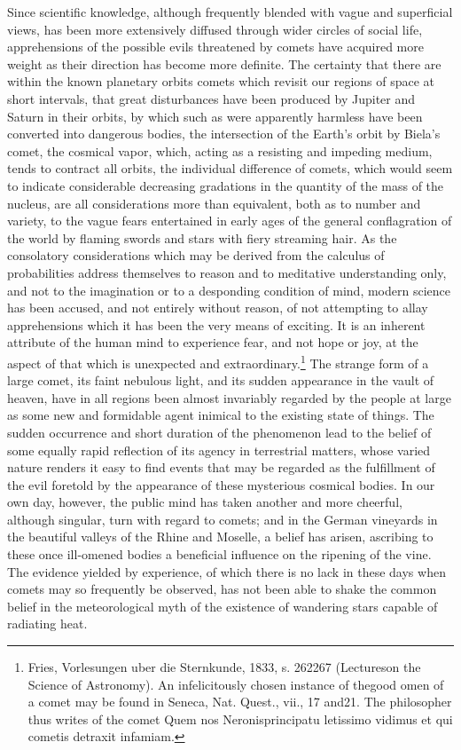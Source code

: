 Since scientific knowledge, although frequently blended with vague and superficial views, has been more extensively diffused through wider circles of social life, apprehensions of the possible evils threatened by comets have acquired more weight as their direction has become more definite. The certainty that there are within the known planetary orbits comets which revisit our regions of space at short intervals, that great disturbances have been produced by Jupiter and Saturn in their orbits, by which such as were apparently harmless have been converted into dangerous bodies, the intersection of the Earth's orbit by Biela's comet, the cosmical vapor, which, acting as a resisting and impeding medium, tends to contract all orbits, the individual difference of comets, which would seem to indicate considerable decreasing gradations in the quantity of the mass of the nucleus, are all considerations more than equivalent, both as to number and variety, to the vague fears entertained in early ages of the general conflagration of the world by flaming swords and stars with fiery streaming hair. As the consolatory considerations which may be derived from the calculus of probabilities address themselves to reason and to meditative understanding only, and not to the imagination or to a desponding condition of mind, modern science has been accused, and not entirely without reason, of not attempting to allay apprehensions which it has been the very means of exciting. It is an inherent attribute of the human mind to experience fear, and not hope or joy, at the aspect of that which is unexpected and extraordinary.\footnote{Fries, Vorlesungen uber die Sternkunde, 1833, s. 262267 (Lectureson the Science of Astronomy). An infelicitously chosen instance of thegood omen of a comet may be found in Seneca, Nat. Quest., vii., 17 and21. The philosopher thus writes of the comet  Quem nos Neronisprincipatu letissimo vidimus et qui cometis detraxit infamiam.} The strange form of a large comet, its faint nebulous light, and its sudden appearance in the vault of heaven, have in all regions been almost invariably regarded by the people at large as some new and formidable agent inimical to the existing state of things. The sudden occurrence and short duration of the phenomenon lead to the belief of some equally rapid reflection of its agency in terrestrial matters, whose varied nature renders it easy to find events that may be regarded as the fulfillment of the evil foretold by the appearance of these mysterious cosmical bodies. In our own day, however, the public mind has taken another and more cheerful, although singular, turn with regard to comets; and in the German vineyards in the beautiful valleys of the Rhine and Moselle, a belief has arisen, ascribing to these once ill-omened bodies a beneficial influence on the ripening of the vine. The evidence yielded by experience, of which there is no lack in these days when comets may so frequently be observed, has not been able to shake the common belief in the meteorological myth of the existence of wandering stars capable of radiating heat.
